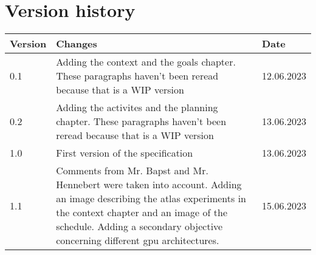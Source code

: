 \chapter{Version history}
\label{chap:spec-versions}

\begin{tabular}{|m{}|m{}|m{}|}
 \hline
 \textbf{Version} & \textbf{Changes} & \textbf{Date} \\ [0.5ex]
 \hline
 0.1 & Adding the context and the goals chapter. These paragraphs haven't been reread because that is a WIP version & 12.06.2023  \\
 \hline
 0.2 & Adding the activites and the planning chapter. These paragraphs haven't been reread because that is a WIP version & 13.06.2023  \\
 \hline
 1.0 & First version of the specification & 13.06.2023  \\
 \hline
 1.1 &
 Comments from Mr. Bapst and Mr. Hennebert were taken into account.
 Adding an image describing the \acrshort{atlas} experiments in the context chapter and an image of the schedule.
 Adding a secondary objective concerning different \acrshort{gpu} architectures.
 & 15.06.2023  \\
 \hline
\end{tabular}